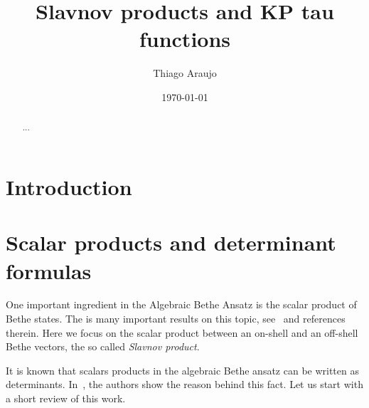 \documentclass[a4paper,11pt]{amsart}
\begin{document}

\title{Slavnov products and KP tau functions}

\author{Thiago Araujo}


\address{\noindent 
Instituto de Ciências Exatas, Departamento de Física\\
Universidade Federal Fluminense\\
Rua Des. Ellis Hermydio Figueira, 783, Aterrado\\
27213-145 Volta Redonda, RJ, Brazil
}


\begin{abstract}
  ...
\end{abstract}

\date{\today}

\maketitle

\setcounter{tocdepth}{1}
\tableofcontents


\section{Introduction}

\section{Scalar products and determinant formulas}

One important ingredient in the Algebraic Bethe Ansatz is the scalar
product of Bethe states.  The is many important results on this topic,
see~\cite{Korepin:1993kvr} and references therein. Here we focus on
the scalar product between an on-shell and an off-shell Bethe vectors,
the so called \emph{Slavnov product}.

It is known that scalars products in the algebraic Bethe ansatz 
can be written as determinants. In~\cite{Belliard:2019bfz}, the
authors show the reason behind this fact. Let us start
with a short review of this work. 
\end{document}
